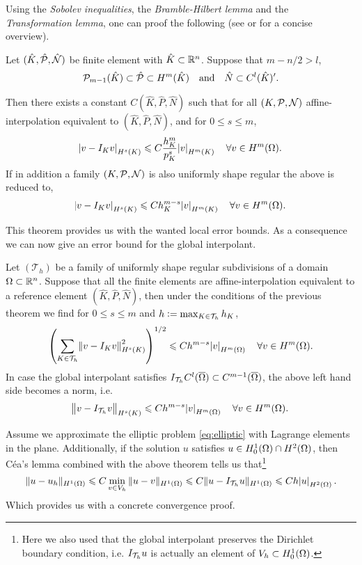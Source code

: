 \documentclass[thesis.tex]{subfiles}
\begin{document}
  Using the \emph{Sobolev inequalities}, the \emph{Bramble-Hilbert lemma} and the \emph{Transformation lemma}, one
  can proof the following (see \cite[Ch~3]{chen} or \cite{stevenson} for a concise overview).
  \begin{thm}
    Let $(\hat K, \hat \P, \hat \N)$ be finite element with $\hat K \subset \R^n$. Suppose that $m - n/ 2 > l$,
    \[
      \P_{m-1}(\hat K) \subset \hat \P \subset H^m(\hat K) \quad \text{and} \quad \hat N \subset  C^l(\hat K)'.
    \]
    
    Then there exists a constant $C(\hat K, \hat P, \hat N)$ such that for all $(K, \P, \N)$ affine-interpolation
      equivalent to $(\hat K, \hat P, \hat N)$, and for $0 \leq s \leq m$,
      \[
        \abs{v - I_K v}_{H^s(K)} \leq C \frac{h_K^{m}}{p_K^s} \abs{v}_{H^m(K)} \quad  \forall v \in H^m(\O).
      \]
      If in addition a family $(K, \P, \N)$ is also uniformly shape regular the above is reduced to,
      \[
        \abs{v - I_K v}_{H^s(K)} \leq C h_K^{m -s} \abs{v}_{H^m(K)} \quad \forall v \in H^m(\O).
      \]
  \end{thm}
  This theorem provides us with the wanted local error bounds. As a consequence we can now
  give an error bound for the global interpolant.
  \begin{thm}
    Let $(\mathcal{T}_h)$ be a family of uniformly shape regular subdivisions of a domain~$\O \subset \R^n$.
    Suppose that all the finite elements are affine-interpolation equivalent to a reference element $(\hat K, \hat P, \hat N)$,
    then under the conditions of the previous theorem we find for $0 \leq s \leq m$ and $h  := \max_{ K \in \T_h} h_K$,
    \[
      \left( \sum_{K \in \T_h} \norm{v - I_K v}^2_{H^s(K)}\right)^{1/2} \leq C h^{m-s} \abs{v}_{H^m(\O)} \quad \forall v \in H^m(\Omega).
    \]
    In case the global interpolant satisfies $I_{\T_h} C^l(\OO) \subset C^{m-1}(\OO)$, the above left hand side becomes a norm, i.e. 
    \[
      \norm{v - I_{\T_h}v}_{H^s(K)} \leq C h^{m-s} \abs{v}_{H^m(\O)} \quad \forall v \in H^m(\Omega).
    \]
  \end{thm}
  Assume we approximate the elliptic problem \eqref{eq:elliptic} with Lagrange elements in the plane. Additionally, if
  the solution $u$ satisfies $u \in H_0^1(\O)\cap H^2(\O)$, then C\'ea's lemma combined with the above theorem tells us that\footnote{
  Here we also used that the global interpolant preserves the Dirichlet boundary condition, i.e.
   $I_{\T_h} u$ is actually an element of $V_h \subset H_0^1(\O)$.}
  \begin{equation}
    \label{eq:conv_h}
    \|u - u_h\|_{H^1(\O)} \leq C \min_{v \in V_h} \| u - v\|_{H^1(\O)} \leq C \| u - I_{\T_h}u \|_{H^1(\O)} \leq C h \abs{u}_{H^2(\O)}.
  \end{equation}
  Which provides us with a concrete convergence proof. 
\end{document}
